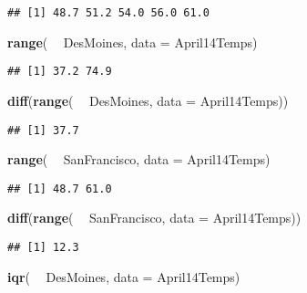 \documentclass[]{book}
\newenvironment{Shaded}{\begin{snugshade}}{\end{snugshade}}
\newcommand{\DataTypeTok}[1]{\textcolor[rgb]{0.13,0.29,0.53}{#1}}
\newcommand{\KeywordTok}[1]{\textcolor[rgb]{0.13,0.29,0.53}{\textbf{#1}}}
\newcommand{\NormalTok}[1]{#1}
\newcommand{\OperatorTok}[1]{\textcolor[rgb]{0.81,0.36,0.00}{\textbf{#1}}}
\newcommand{\StringTok}[1]{\textcolor[rgb]{0.31,0.60,0.02}{#1}}
\begin{document}
\begin{verbatim}
## [1] 48.7 51.2 54.0 56.0 61.0
\end{verbatim}

\begin{Shaded}
\begin{Highlighting}[]
\KeywordTok{range}\NormalTok{( }\OperatorTok{~}\StringTok{ }\NormalTok{DesMoines, }\DataTypeTok{data =}\NormalTok{ April14Temps)}
\end{Highlighting}
\end{Shaded}

\begin{verbatim}
## [1] 37.2 74.9
\end{verbatim}

\begin{Shaded}
\begin{Highlighting}[]
\KeywordTok{diff}\NormalTok{(}\KeywordTok{range}\NormalTok{( }\OperatorTok{~}\StringTok{ }\NormalTok{DesMoines, }\DataTypeTok{data =}\NormalTok{ April14Temps))}
\end{Highlighting}
\end{Shaded}

\begin{verbatim}
## [1] 37.7
\end{verbatim}

\begin{Shaded}
\begin{Highlighting}[]
\KeywordTok{range}\NormalTok{( }\OperatorTok{~}\StringTok{ }\NormalTok{SanFrancisco, }\DataTypeTok{data =}\NormalTok{ April14Temps)}
\end{Highlighting}
\end{Shaded}

\begin{verbatim}
## [1] 48.7 61.0
\end{verbatim}

\begin{Shaded}
\begin{Highlighting}[]
\KeywordTok{diff}\NormalTok{(}\KeywordTok{range}\NormalTok{( }\OperatorTok{~}\StringTok{ }\NormalTok{SanFrancisco, }\DataTypeTok{data =}\NormalTok{ April14Temps))}
\end{Highlighting}
\end{Shaded}

\begin{verbatim}
## [1] 12.3
\end{verbatim}

\begin{Shaded}
\begin{Highlighting}[]
\KeywordTok{iqr}\NormalTok{( }\OperatorTok{~}\StringTok{ }\NormalTok{DesMoines, }\DataTypeTok{data =}\NormalTok{ April14Temps)}
\end{Highlighting}
\end{Shaded}
\end{document}
